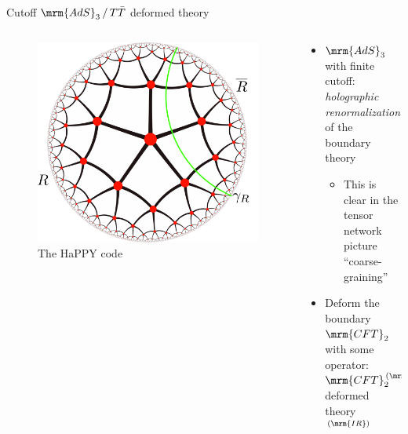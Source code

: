 \documentclass[aspectratio=169,10pt
	,noamsthm
]{beamer}
\begin{document}
\begin{frame}{Cutoff $\mrm{AdS}_3\,/\,T\bar{T}$ deformed theory}{%
	\textcite{McGough:2016lol}%
}
	\begin{columns}
	\begin{column}{.35\textwidth}
		\begin{figure}[!h]
		\centering
		\includegraphics[height=.55\textheight]{img/cutnetwork.pdf}
		\caption{The HaPPY code \cite{Pastawski:2015qua,Harlow:2018fse}}
		\end{figure}
	\end{column}
	\begin{column}{.65\textwidth}
		\begin{itemize}
		\item $\mrm{AdS}_3$ with finite cutoff:\\
		\textit{holographic renormalization} of the boundary theory
		
	\pause
		
			\begin{itemize}
			\item This is clear in the tensor network picture\\
			``coarse-graining''
			\end{itemize}
		
	\pause
		
		\item Deform the boundary $\mrm{CFT}_2$ with some operator:\\
		$\mrm{CFT}_2^{\,(\mrm{UV})} \leadsto {}$deformed theory$^{\,(\mrm{IR})}$
		

\end{itemize}
\end{column}
\end{columns}
\end{frame}
\end{document}
